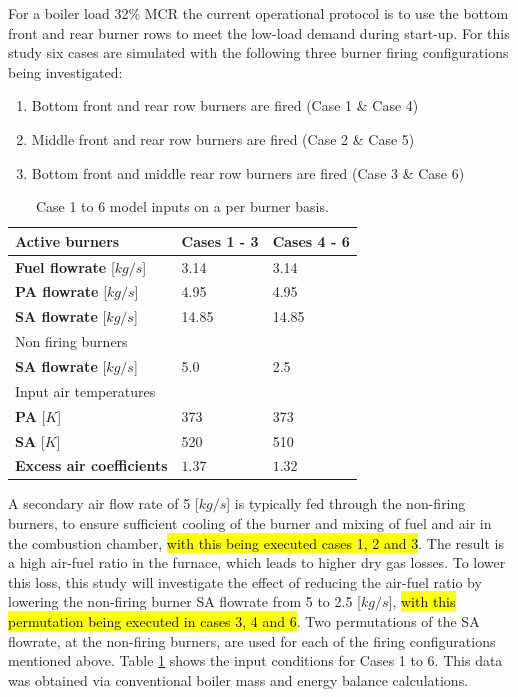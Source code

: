 \documentclass[twocolumn,10pt]{asme2ej}
\newcommand{\highlight}[1]{%
  \colorbox{yellow!}{$\displaystyle#1$}}
\begin{document}
For a boiler load 32\% MCR the current operational protocol is to use the bottom front and rear burner rows to meet the low-load demand during start-up.  For this study six cases are simulated with the following three burner firing configurations being investigated:
\begin{enumerate}
\item Bottom front and rear row burners are fired (Case 1 \& Case 4)
\item Middle front and rear row burners are fired (Case 2 \& Case 5)
\item Bottom front and middle rear row burners are fired (Case 3 \& Case 6)
\end{enumerate}
\begin{table}[h!]
\centering
\caption{Case 1 to 6 model inputs on a per burner basis.}
\label{tbl_case_inputs}
\vspace{2mm}
{\tabulinesep=1.2mm
\begin{tabularx}{3.25in}{p{1.4in} p{0.75in} l}
\hline
Active burners & \textbf{Cases 1 - 3} & \textbf{Cases 4 - 6}\\
\hline
\textbf{Fuel flowrate} [$kg/s$]&3.14  &3.14\\
\textbf{PA flowrate} [$kg/s$]&4.95  &4.95\\
\textbf{SA flowrate} [$kg/s$]&14.85  &14.85\\
\hline
Non firing burners &  & \\
\hline
\textbf{SA flowrate} [$kg/s$]&5.0  &2.5\\
\hline
Input air temperatures& &\\
\hline
\textbf{PA} [$K$]&373  &373\\
\textbf{SA} [$K$]&520  &510\\
\hline
\textbf{Excess air coefficients} & \highlight{1.37} & \highlight{1.32}\\
\hline

\end{tabularx}}
\vspace{0pt}
\end{table}

A secondary air flow rate of 5 [$kg/s$] is typically fed through the non-firing burners, to ensure sufficient cooling of the burner and mixing of fuel and air in the combustion chamber,\hl{ with this being executed cases 1, 2 and 3}. The result is a high air-fuel ratio in the furnace, which leads to higher dry gas losses. To lower this loss, this study will investigate the effect of reducing the air-fuel ratio by lowering the non-firing burner SA flowrate from 5 to 2.5 [$kg/s$], \hl{with this permutation being executed in cases 3, 4 and 6}. Two permutations of the SA flowrate, at the non-firing burners, are used for each of the firing configurations mentioned above. Table \ref{tbl_case_inputs} shows the input conditions for Cases 1 to 6. This data was obtained via conventional boiler mass and energy balance calculations.
\end{document}
